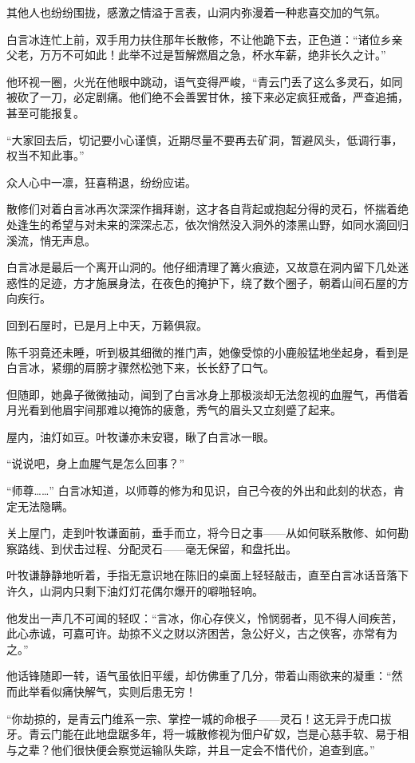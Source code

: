其他人也纷纷围拢，感激之情溢于言表，山洞内弥漫着一种悲喜交加的气氛。

白言冰连忙上前，双手用力扶住那年长散修，不让他跪下去，正色道：“诸位乡亲父老，万万不可如此！此举不过是暂解燃眉之急，杯水车薪，绝非长久之计。”

他环视一圈，火光在他眼中跳动，语气变得严峻，“青云门丢了这么多灵石，如同被砍了一刀，必定剧痛。他们绝不会善罢甘休，接下来必定疯狂戒备，严查追捕，甚至可能报复。

“大家回去后，切记要小心谨慎，近期尽量不要再去矿洞，暂避风头，低调行事，权当不知此事。”

众人心中一凛，狂喜稍退，纷纷应诺。

散修们对着白言冰再次深深作揖拜谢，这才各自背起或抱起分得的灵石，怀揣着绝处逢生的希望与对未来的深深忐忑，依次悄然没入洞外的漆黑山野，如同水滴回归溪流，悄无声息。

白言冰是最后一个离开山洞的。他仔细清理了篝火痕迹，又故意在洞内留下几处迷惑性的足迹，方才施展身法，在夜色的掩护下，绕了数个圈子，朝着山间石屋的方向疾行。

\vspace{2em}

回到石屋时，已是月上中天，万籁俱寂。

陈千羽竟还未睡，听到极其细微的推门声，她像受惊的小鹿般猛地坐起身，看到是白言冰，紧绷的肩膀才骤然松弛下来，长长舒了口气。

但随即，她鼻子微微抽动，闻到了白言冰身上那极淡却无法忽视的血腥气，再借着月光看到他眉宇间那难以掩饰的疲惫，秀气的眉头又立刻蹙了起来。

屋内，油灯如豆。叶牧谦亦未安寝，瞅了白言冰一眼。

“说说吧，身上血腥气是怎么回事？”

“师尊……” 白言冰知道，以师尊的修为和见识，自己今夜的外出和此刻的状态，肯定无法隐瞒。

关上屋门，走到叶牧谦面前，垂手而立，将今日之事——从如何联系散修、如何勘察路线、到伏击过程、分配灵石——毫无保留，和盘托出。

叶牧谦静静地听着，手指无意识地在陈旧的桌面上轻轻敲击，直至白言冰话音落下许久，山洞内只剩下油灯灯花偶尔爆开的噼啪轻响。

他发出一声几不可闻的轻叹：“言冰，你心存侠义，怜悯弱者，见不得人间疾苦，此心赤诚，可嘉可许。劫掠不义之财以济困苦，急公好义，古之侠客，亦常有为之。”

他话锋随即一转，语气虽依旧平缓，却仿佛重了几分，带着山雨欲来的凝重：“然而此举看似痛快解气，实则后患无穷！

“你劫掠的，是青云门维系一宗、掌控一城的命根子——灵石！这无异于虎口拔牙。青云门能在此地盘踞多年，将一城散修视为佃户矿奴，岂是心慈手软、易于相与之辈？他们很快便会察觉运输队失踪，并且一定会不惜代价，追查到底。”

